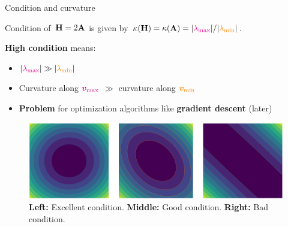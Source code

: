 \documentclass[11pt,compress,t,notes=noshow, xcolor=table]{beamer}
\begin{document}
\begin{vbframe}{Condition and curvature}

Condition of~$\mathbf{H} = 2\mathbf{A}$ is given by $\kappa(\mathbf{H}) = \kappa(\mathbf{A}) = |\textcolor{magenta}{\lambda_\text{max}}| / |\textcolor{orange}{\lambda_\text{min}}|$.

\vspace{\baselineskip}

\textbf{High condition} means: 

\begin{itemize}
    \item $|\textcolor{magenta}{\lambda_\text{max}}| \gg |\textcolor{orange}{\lambda_\text{min}}|$
    \item Curvature along $\textcolor{magenta}{\bm{v}_\text{max}}$ $\gg$ curvature along $\textcolor{orange}{\bm{v}_\text{min}}$
    \item \textbf{Problem} for optimization algorithms like \textbf{gradient descent} (later)
\end{itemize}

\begin{figure}
    \centering
    \includegraphics[width=\textwidth]{figure_man/quadr-conds.png}
    \caption*{\footnotesize \textbf{Left:} Excellent condition. \textbf{Middle:} Good condition. \textbf{Right:} Bad condition.}
\end{figure}

\end{vbframe}
\end{document}
